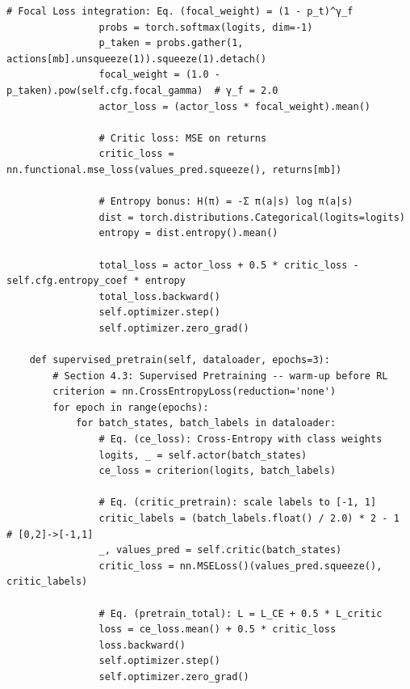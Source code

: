 \documentclass[12pt,a4paper]{article}
\begin{document}
\begin{lstlisting}[caption=PPO Agent Implementation with GAE and Focal Loss, label=lst:ppo_agent]
                # Focal Loss integration: Eq. (focal_weight) = (1 - p_t)^γ_f
                probs = torch.softmax(logits, dim=-1)
                p_taken = probs.gather(1, actions[mb].unsqueeze(1)).squeeze(1).detach()
                focal_weight = (1.0 - p_taken).pow(self.cfg.focal_gamma)  # γ_f = 2.0
                actor_loss = (actor_loss * focal_weight).mean()

                # Critic loss: MSE on returns
                critic_loss = nn.functional.mse_loss(values_pred.squeeze(), returns[mb])

                # Entropy bonus: H(π) = -Σ π(a|s) log π(a|s)
                dist = torch.distributions.Categorical(logits=logits)
                entropy = dist.entropy().mean()

                total_loss = actor_loss + 0.5 * critic_loss - self.cfg.entropy_coef * entropy
                total_loss.backward()
                self.optimizer.step()
                self.optimizer.zero_grad()

    def supervised_pretrain(self, dataloader, epochs=3):
        # Section 4.3: Supervised Pretraining -- warm-up before RL
        criterion = nn.CrossEntropyLoss(reduction='none')
        for epoch in range(epochs):
            for batch_states, batch_labels in dataloader:
                # Eq. (ce_loss): Cross-Entropy with class weights
                logits, _ = self.actor(batch_states)
                ce_loss = criterion(logits, batch_labels)

                # Eq. (critic_pretrain): scale labels to [-1, 1]
                critic_labels = (batch_labels.float() / 2.0) * 2 - 1  # [0,2]->[-1,1]
                _, values_pred = self.critic(batch_states)
                critic_loss = nn.MSELoss()(values_pred.squeeze(), critic_labels)

                # Eq. (pretrain_total): L = L_CE + 0.5 * L_critic
                loss = ce_loss.mean() + 0.5 * critic_loss
                loss.backward()
                self.optimizer.step()
                self.optimizer.zero_grad()
\end{lstlisting}
\end{document}
